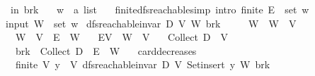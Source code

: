\begin{isabellebody}
\ \ in\ brk{\isachardoublequoteclose}\isanewline
\isanewline
\isanewline
{}\isamarkupfalse%
\isanewline
\ \ \ w\ {\isacharcolon}{\kern0pt}{\isacharcolon}{\kern0pt}\ {\isachardoublequoteopen}{\isacharprime}{\kern0pt}a\ list{\isachardoublequoteclose}\isanewline
\ \ \ finite{\isacharunderscore}{\kern0pt}dfs{\isacharunderscore}{\kern0pt}reachable{\isacharbrackleft}{\kern0pt}simp{\isacharcomma}{\kern0pt}\ intro{\isacharbang}{\kern0pt}{\isacharbrackright}{\kern0pt}{\isacharcolon}{\kern0pt}\ {\isachardoublequoteopen}finite\ {\isacharparenleft}{\kern0pt}E\isactrlsup {\isacharasterisk}{\kern0pt}\ {\isacharbackquote}{\kern0pt}{\isacharbackquote}{\kern0pt}\ set\ w\isanewline
{}\isanewline
\isanewline
\ \ \ \isamarkupfalse%
\ {\isacharparenleft}{\kern0pt}input{\isacharparenright}{\kern0pt}\ {\isachardoublequoteopen}W\ {\isasymequiv}\ set\ w\isanewline
\isanewline
{}\isamarkupfalse%
\ {\isachardoublequoteopen}dfs{\isacharunderscore}{\kern0pt}reachable{\isacharunderscore}{\kern0pt}invar\ D\ V\ W\ brk\ {\isasymlongleftrightarrow}\isanewline
\ \ \ \ W\ {\isasymsubseteq}\ W\ {\isasymunion}\ V\isanewline
\ \ {\isasymand}\ W\ {\isasymunion}\ V\ {\isasymsubseteq}\ E\isactrlsup {\isacharasterisk}{\kern0pt}\ {\isacharbackquote}{\kern0pt}{\isacharbackquote}{\kern0pt}\ W\isanewline
\ \ {\isasymand}\ E{\isacharbackquote}{\kern0pt}{\isacharbackquote}{\kern0pt}V\ {\isasymsubseteq}\ W\ {\isasymunion}\ V\isanewline
\ \ {\isasymand}\ Collect\ D\ {\isasyminter}\ V\ {\isacharequal}{\kern0pt}\ {\isacharbraceleft}{\kern0pt}{\isacharbraceright}{\kern0pt}\isanewline
\ \ {\isasymand}\ {\isacharparenleft}{\kern0pt}brk\ {\isasymlongrightarrow}\ Collect\ D\ {\isasyminter}\ E\isactrlsup {\isacharasterisk}{\kern0pt}\ {\isacharbackquote}{\kern0pt}{\isacharbackquote}{\kern0pt}\ W\ {\isasymnoteq}\ {\isacharbraceleft}{\kern0pt}{\isacharbraceright}{\kern0pt}{\isacharparenright}{\kern0pt}{\isachardoublequoteclose}\isanewline
\isanewline
{}\isamarkupfalse%
\ card{\isacharunderscore}{\kern0pt}decreases{\isacharcolon}{\kern0pt}\ {\isachardoublequoteopen}\isanewline
\ \ \ {\isasymlbrakk}finite\ V{\isacharsemicolon}{\kern0pt}\ y\ {\isasymnotin}\ V{\isacharsemicolon}{\kern0pt}\ dfs{\isacharunderscore}{\kern0pt}reachable{\isacharunderscore}{\kern0pt}invar\ D\ V\ {\isacharparenleft}{\kern0pt}Set{\isachardot}{\kern0pt}insert\ y\ W{\isacharparenright}{\kern0pt}\ brk\ {\isasymrbrakk}\isanewline

\end{isabellebody}
